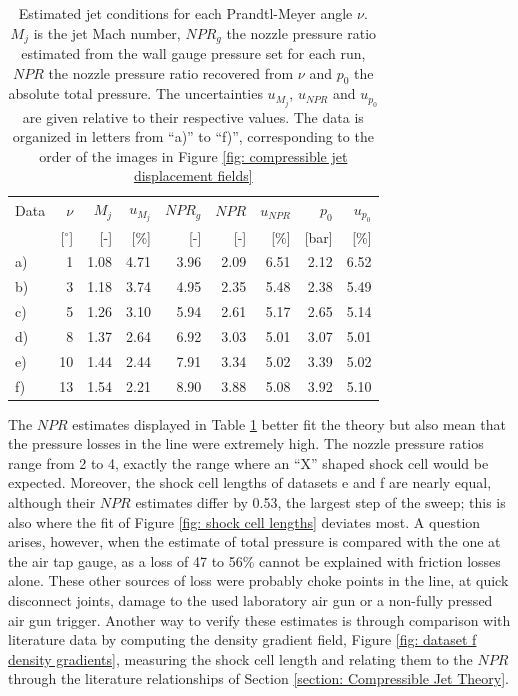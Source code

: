 \begin{table}[htbp]
    \centering
    \caption[Jet conditions estimated from the Prandtl-Meyer angle]{Estimated jet conditions for each Prandtl-Meyer angle $\nu$. $M_j$ is the jet Mach number, $NPR_g$ the nozzle pressure ratio estimated from the wall gauge pressure set for each run, $NPR$ the nozzle pressure ratio recovered from $\nu$ and $p_0$ the absolute total pressure. The uncertainties $u_{M_j}$, $u_{NPR}$ and $u_{p_0}$ are given relative to their respective values. The data is organized in letters from ``a)'' to ``f)'', corresponding to the order of the images in Figure \ref{fig: compressible jet displacement fields}}
    \label{tab: compressible jet NPR estimates}
    \begin{tabular}{lrrrrrrrr}
        \toprule
        Data & $\nu$ & $M_j$ & $u_{M_j}$ & $NPR_g$ & $NPR$ & $u_{NPR}$ & $p_0$ & $u_{p_0}$ \\
             & [$^{\circ}$] & [-] & [\%] & [-] & [-] & [\%] & [bar] & [\%] \\
        \midrule
        a) &  1 & 1.08 & 4.71 & 3.96 & 2.09 & 6.51 & 2.12 & 6.52 \\
        b) &  3 & 1.18 & 3.74 & 4.95 & 2.35 & 5.48 & 2.38 & 5.49 \\
        c) &  5 & 1.26 & 3.10 & 5.94 & 2.61 & 5.17 & 2.65 & 5.14 \\
        d) &  8 & 1.37 & 2.64 & 6.92 & 3.03 & 5.01 & 3.07 & 5.01 \\
        e) & 10 & 1.44 & 2.44 & 7.91 & 3.34 & 5.02 & 3.39 & 5.02 \\
        f) & 13 & 1.54 & 2.21 & 8.90 & 3.88 & 5.08 & 3.92 & 5.10 \\
        \bottomrule
    \end{tabular}
\end{table}

The $NPR$ estimates displayed in Table \ref{tab: compressible jet NPR estimates} better fit the theory but also mean that the pressure losses in the line were extremely high. The nozzle pressure ratios range from 2 to 4, exactly the range where an ``X'' shaped shock cell would be expected. Moreover, the shock cell lengths of datasets e and f are nearly equal, although their $NPR$ estimates differ by 0.53, the largest step of the sweep; this is also where the fit of Figure \ref{fig: shock cell lengths} deviates most. A question arises, however, when the estimate of total pressure is compared with the one at the air tap gauge, as a loss of 47 to 56\% cannot be explained with friction losses alone. These other sources of loss were probably choke points in the line, at quick disconnect joints, damage to the used laboratory air gun or a non-fully pressed air gun trigger. Another way to verify these estimates is through comparison with literature data by computing the density gradient field, Figure \ref{fig: dataset f density gradients}, measuring the shock cell length and relating them to the $NPR$ through the literature relationships of Section \ref{section: Compressible Jet Theory}.

